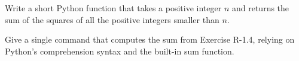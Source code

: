  \label{sssec:ex1_41_5}

Write a short Python function that takes a positive integer $n$ and returns the sum of the squares of all the positive integers smaller than $n$.

Give a single command that computes the sum from Exercise R-1.4, relying on Python's comprehension syntax and the built-in sum function.


